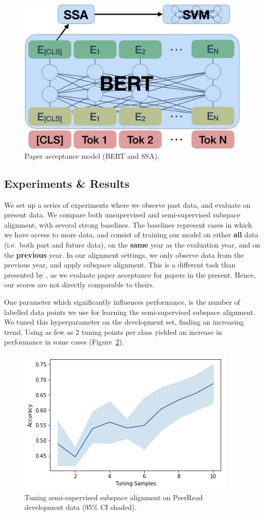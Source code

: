 \documentclass[letterpaper]{article} %
\begin{document}
\begin{figure}[!t]
    \centering
    \includegraphics[width=0.75\columnwidth]{tda_peerread.png}
    \caption{Paper acceptance model (BERT and SSA).}
    \label{fig:bertseq}
\end{figure}

\subsection{Experiments \& Results}
We set up a series of experiments where we observe past data, and evaluate on present data. 
We compare both unsupervised and semi-supervised subspace alignment, with several strong baselines.
The baselines represent cases in which we have access to more data, and consist of training our model on either \textbf{all} data (i.e.~both past and future data), on the \textbf{same} year as the evaluation year, and on the \textbf{previous} year.
In our alignment settings, we only observe data from the previous year, and apply subspace alignment.
This is a different task than presented by \citeauthor{kang18naacl}, as we evaluate paper acceptance for papers in the present. Hence, our scores are not directly comparable to theirs.

One parameter which significantly influences performance, is the number of labelled data points we use for learning the semi-supervised subspace alignment.
We tuned this hyperparameter on the development set, finding an increasing trend. Using as few as 2 tuning points per class yielded an increase in performance in some cases (Figure~\ref{fig:hyperparam}).

\begin{figure}[!t]
    \centering
    \includegraphics[width=0.8\columnwidth]{tuning.png}
    \caption{Tuning semi-supervised subspace alignment on PeerRead development data (95\% CI shaded).}
    \label{fig:hyperparam}
\end{figure}
\end{document}
